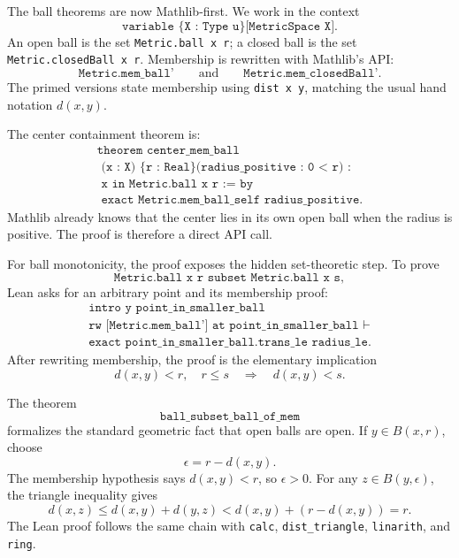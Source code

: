\begin{remark*}
The ball theorems are now Mathlib-first. We work in the context
\[
  \texttt{variable \{X : Type u\} [MetricSpace X]}.
\]
An open ball is the set \texttt{Metric.ball x r}; a closed ball is the set
\texttt{Metric.closedBall x r}. Membership is rewritten with Mathlib's API:
\[
  \texttt{Metric.mem\_ball'}
  \qquad\text{and}\qquad
  \texttt{Metric.mem\_closedBall'}.
\]
The primed versions state membership using \texttt{dist x y}, matching the
usual hand notation \(d(x,y)\).
\end{remark*}

\begin{remark*}
The center containment theorem is:
\[
\begin{gathered}
  \texttt{theorem center\_mem\_ball}\\
  \texttt{\ \ \ \ (x : X) \{r : Real\} (radius\_positive : 0 < r) :}\\
  \texttt{\ \ \ \ x in Metric.ball x r := by}\\
  \texttt{\ \ exact Metric.mem\_ball\_self radius\_positive.}
\end{gathered}
\]
Mathlib already knows that the center lies in its own open ball when the radius
is positive. The proof is therefore a direct API call.
\end{remark*}

\begin{remark*}
For ball monotonicity, the proof exposes the hidden set-theoretic step. To
prove
\[
  \texttt{Metric.ball x r subset Metric.ball x s},
\]
Lean asks for an arbitrary point and its membership proof:
\[
\begin{gathered}
  \texttt{intro y point\_in\_smaller\_ball}\\
  \texttt{rw [Metric.mem\_ball'] at point\_in\_smaller\_ball ⊢}\\
  \texttt{exact point\_in\_smaller\_ball.trans\_le radius\_le.}
\end{gathered}
\]
After rewriting membership, the proof is the elementary implication
\[
  d(x,y) < r,\quad r \le s
  \quad\Longrightarrow\quad
  d(x,y) < s.
\]
\end{remark*}

\begin{remark*}
The theorem
\[
  \texttt{ball\_subset\_ball\_of\_mem}
\]
formalizes the standard geometric fact that open balls are open. If
\(y \in B(x,r)\), choose
\[
  \epsilon = r - d(x,y).
\]
The membership hypothesis says \(d(x,y) < r\), so \(\epsilon > 0\). For any
\(z \in B(y,\epsilon)\), the triangle inequality gives
\[
  d(x,z) \le d(x,y) + d(y,z)
    < d(x,y) + (r-d(x,y))
    = r.
\]
The Lean proof follows the same chain with \texttt{calc}, \texttt{dist\_triangle},
\texttt{linarith}, and \texttt{ring}.
\end{remark*}
